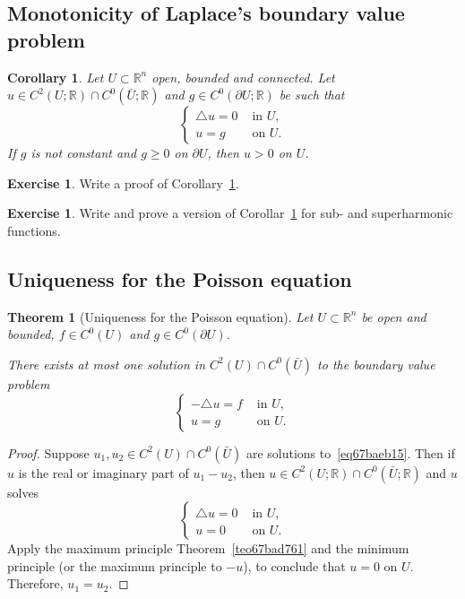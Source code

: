 \documentclass[a4paper,9pt]{amsart}
\newcommand{\R}{\mathbb{R}}	%
\newcommand{\de}{\partial}		%
\newcommand{\laplacian}{\triangle}
\theoremstyle{plain}
\newtheorem{theorem}[proposition]{Theorem}
\newtheorem{corollary}[proposition]{Corollary}
\theoremstyle{definition}
\newtheorem{exercise}[proposition]{Exercise}%
\theoremstyle{remark}
\begin{document}
\subsection{Monotonicity of Laplace's boundary value problem}\label{subs67baea83}

\begin{corollary}\label{cor67bae9fc}
	Let $U\subset\R^n$ open, bounded and connected.
	Let $u\in C^2(U;\R)\cap C^0(\bar U;\R)$ and $g\in C^0(\de U;\R)$ be such that
	\[
	\begin{cases}
		\laplacian u = 0 &\text{ in }U ,\\
		u = g &\text{ on }U .
	\end{cases}
	\]
	If $g$ is not constant and $g\ge 0$ on $\de U$, then $u>0$ on $U$.
\end{corollary}

\begin{exercise}
	Write a proof of Corollary~\ref{cor67bae9fc}.
\end{exercise}

\begin{exercise}
	Write and prove a version of Corollar~\ref{cor67bae9fc} for sub- and superharmonic functions.
\end{exercise}

\subsection{Uniqueness for the Poisson equation}\label{subs67baea7d}

\begin{theorem}[Uniqueness for the Poisson equation]\label{teo67baea93}
	Let $U\subset\R^n$ be open and bounded, $f\in C^0(U)$ and $g\in C^0(\de U)$.
	
	There exists at most one solution in $C^2(U)\cap C^0(\bar U)$ to the boundary value problem
	\begin{equation}\label{eq67baeb15}
	\begin{cases}
		- \laplacian u = f &\text{ in }U ,\\
		u = g &\text{ on }U .
	\end{cases}
	\end{equation}
\end{theorem}
\begin{proof}
	Suppose $u_1,u_2\in C^2(U)\cap C^0(\bar U)$ are solutions to~\eqref{eq67baeb15}.
	Then if $u$ is the real or imaginary part of $u_1-u_2$, then $u\in C^2(U;\R)\cap C^0(\bar U;\R)$ and $u$ solves
	\begin{equation}\label{eq67baeb46}
	\begin{cases}
		\laplacian u = 0 &\text{ in }U ,\\
		u = 0 &\text{ on }U .
	\end{cases}
	\end{equation}
	Apply the maximum principle Theorem~\ref{teo67bad761} and the minimum principle (or the maximum principle to $-u$), to conclude that $u=0$ on $U$.
	Therefore, $u_1=u_2$.
\end{proof}
\end{document}
